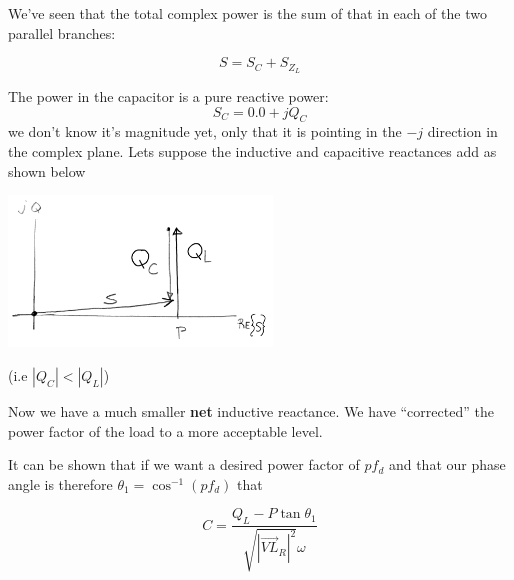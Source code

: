 We've seen that the total complex
power is the sum of that in each of the two parallel branches:

\[
S = S_C + S_{Z_L}
\]

The power in the capacitor is a pure reactive power:
\[
S_C = 0.0 + j Q_C
\]
we don't know it's magnitude yet, only that it is pointing in the $-j$ direction
in the complex plane.   Lets suppose the inductive and capacitive reactances add
as shown below

\includegraphics[width=70mm]{figsChapt03/MF77903.png}

(i.e $|Q_C| < |Q_L|$)

Now we have a much smaller {\bf net} inductive reactance.   We have ``corrected''
the power factor of the load to a more acceptable level.

It can be shown that  if we want a desired power factor of $pf_d$ and that our phase
angle is therefore $\theta_1 = \cos^{-1}(pf_d)$ that

\[
C = \frac{Q_L - P \tan \theta_1}{\sqrt{|\vec{VL}_R|^2} \omega}
\]
%
%
%
%
%
%
%
%
%
%
%
%
%
%
%

%


